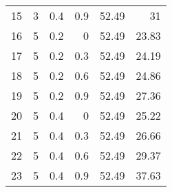 \begin{tabular}{rrrrrr}
 15 &                         3 &                        0.4 &                  0.9 &         52.49 &                  31    \\
 16 &                         5 &                        0.2 &                  0   &         52.49 &                  23.83 \\
 17 &                         5 &                        0.2 &                  0.3 &         52.49 &                  24.19 \\
 18 &                         5 &                        0.2 &                  0.6 &         52.49 &                  24.86 \\
 19 &                         5 &                        0.2 &                  0.9 &         52.49 &                  27.36 \\
 20 &                         5 &                        0.4 &                  0   &         52.49 &                  25.22 \\
 21 &                         5 &                        0.4 &                  0.3 &         52.49 &                  26.66 \\
 22 &                         5 &                        0.4 &                  0.6 &         52.49 &                  29.37 \\
 23 &                         5 &                        0.4 &                  0.9 &         52.49 &                  37.63 \\
\hline
\end{tabular}
